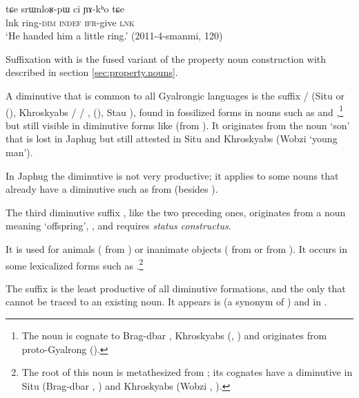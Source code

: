 \begin{exe}
\ex \label{ex:srWnloR}
\gll tɕe srɯnloʁ-pɯ ci ɲɤ-kʰo tɕe \\
lnk ring-\textsc{dim} \textsc{indef} \textsc{ifr}-give \textsc{lnk} \\
\glt `He handed him a little ring.' (2011-4-smanmi, 120)
\end{exe}

Suffixation with  is the fused variant of the property noun construction with  described in section \ref{sec:property.nouns}.

A diminutive that is common to all Gyalrongic languages is the suffix / (Situ  or  (\citealt[163]{linxr93jiarongen}), Khroskyabs  /  / ,  (\citealt[158]{lai17khroskyabs}), Stau ), found in fossilized forms in nouns such as  and ,\footnote{The noun  is cognate to Brag-dbar , Khroskyabs  (\citealt{zhang16bragdbar}, \citealt[156]{lai17khroskyabs}) and originates from proto-Gyalrong  (\citealt[53]{jacques08zh}). } but still visible in diminutive forms like  (from ). It originates from the noun `son' that is lost in Japhug but still attested in Situ and Khroskyabs (Wobzi  `young man'). 

In Japhug the  diminutive is not very productive; it applies to some nouns that already have a  diminutive such as  from  (besides ).

The third diminutive suffix , like the two preceding ones, originates from a noun meaning `offspring', , and requires \textit{status constructus}.

It is  used for animals ( from ) or inanimate objects ( from  or  from ). It occurs in some lexicalized forms such as .\footnote{The root of this noun is metathesized from ; its cognates have a  diminutive in Situ (Brag-dbar , \citealt[228]{zhang16bragdbar}) and Khroskyabs (Wobzi , \citealt[115]{lai17khroskyabs}).}

The suffix  is the least productive of all diminutive formations, and the only that cannot be traced to an existing noun. It appears is  (a synonym of ) and in .

